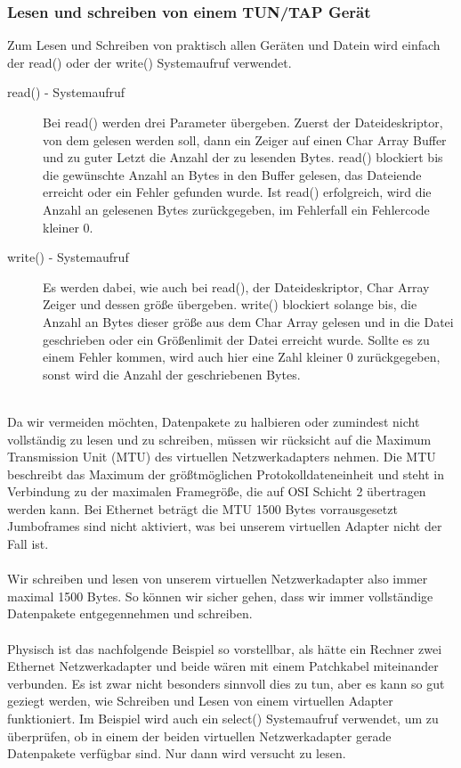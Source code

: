 \subsubsection{Lesen und schreiben von einem TUN/TAP Gerät}
Zum Lesen und Schreiben von praktisch allen Geräten und Datein wird einfach der read() oder der write() Systemaufruf verwendet. 
\\
\begin{description}
    \item[read() - Systemaufruf] Bei read() werden drei Parameter übergeben. Zuerst der Dateideskriptor, von dem gelesen werden soll, dann ein Zeiger auf einen Char Array Buffer und zu guter Letzt die Anzahl der zu lesenden Bytes. read() blockiert bis die gewünschte Anzahl an Bytes in den Buffer gelesen, das Dateiende erreicht oder ein Fehler gefunden wurde. Ist read() erfolgreich, wird die Anzahl an gelesenen Bytes zurückgegeben, im Fehlerfall ein Fehlercode kleiner 0.
    \\%
    \item[write() - Systemaufruf] Es werden dabei, wie auch bei read(), der Dateideskriptor, Char Array Zeiger und dessen größe übergeben. write() blockiert solange bis, die Anzahl an Bytes dieser größe aus dem Char Array gelesen und in die Datei geschrieben oder ein Größenlimit der Datei erreicht wurde. Sollte es zu einem Fehler kommen, wird auch hier eine Zahl kleiner 0 zurückgegeben, sonst wird die Anzahl der geschriebenen Bytes.
\end{description}
\ \\
Da wir vermeiden möchten, Datenpakete zu halbieren oder zumindest nicht vollständig zu lesen und zu schreiben, müssen wir rücksicht auf die Maximum Transmission Unit (MTU) des virtuellen Netzwerkadapters nehmen. Die MTU beschreibt das Maximum der größtmöglichen Protokolldateneinheit und steht in Verbindung zu der maximalen Framegröße, die auf OSI Schicht 2 übertragen werden kann. Bei Ethernet beträgt die MTU 1500 Bytes vorrausgesetzt Jumboframes sind nicht aktiviert, was bei unserem virtuellen Adapter nicht der Fall ist.
\\\\
Wir schreiben und lesen von unserem virtuellen Netzwerkadapter also immer maximal 1500 Bytes. So können wir sicher gehen, dass wir immer vollständige Datenpakete entgegennehmen und schreiben.
\\\\
Physisch ist das nachfolgende Beispiel so vorstellbar, als hätte ein Rechner zwei Ethernet Netzwerkadapter und beide wären mit einem Patchkabel miteinander verbunden. Es ist zwar nicht besonders sinnvoll dies zu tun, aber es kann so gut geziegt werden, wie Schreiben und Lesen von einem virtuellen Adapter funktioniert. Im Beispiel wird auch ein select() Systemaufruf verwendet, um zu überprüfen, ob in einem der beiden virtuellen Netzwerkadapter gerade Datenpakete verfügbar sind. Nur dann wird versucht zu lesen.
